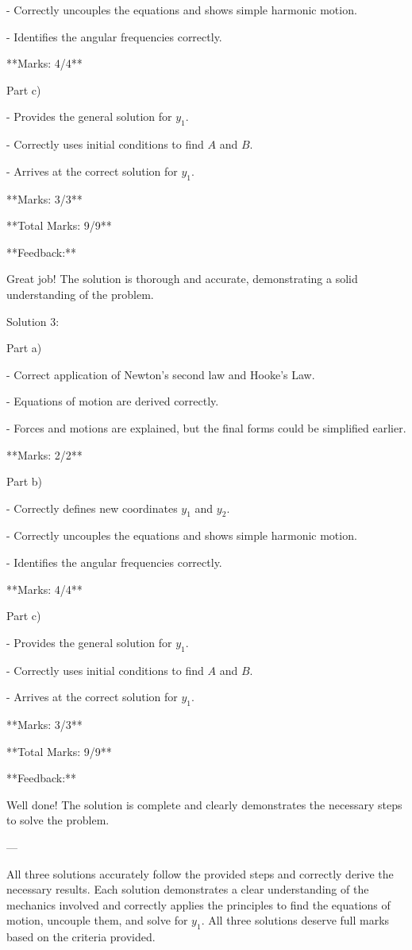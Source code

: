 \documentclass[a4paper,11pt]{article}
\begin{document}
- Correctly uncouples the equations and shows simple harmonic motion.

- Identifies the angular frequencies correctly.

**Marks: 4/4**

Part c)

- Provides the general solution for \( y_1 \).

- Correctly uses initial conditions to find \( A \) and \( B \).

- Arrives at the correct solution for \( y_1 \).

**Marks: 3/3**

**Total Marks: 9/9**

**Feedback:**

Great job! The solution is thorough and accurate, demonstrating a solid understanding of the problem.

Solution 3:

Part a)

- Correct application of Newton's second law and Hooke's Law.

- Equations of motion are derived correctly.

- Forces and motions are explained, but the final forms could be simplified earlier.

**Marks: 2/2**

Part b)

- Correctly defines new coordinates \( y_1 \) and \( y_2 \).

- Correctly uncouples the equations and shows simple harmonic motion.

- Identifies the angular frequencies correctly.

**Marks: 4/4**

Part c)

- Provides the general solution for \( y_1 \).

- Correctly uses initial conditions to find \( A \) and \( B \).

- Arrives at the correct solution for \( y_1 \).

**Marks: 3/3**

**Total Marks: 9/9**

**Feedback:**

Well done! The solution is complete and clearly demonstrates the necessary steps to solve the problem.

---

All three solutions accurately follow the provided steps and correctly derive the necessary results. Each solution demonstrates a clear understanding of the mechanics involved and correctly applies the principles to find the equations of motion, uncouple them, and solve for \( y_1 \). All three solutions deserve full marks based on the criteria provided.
\end{document}
